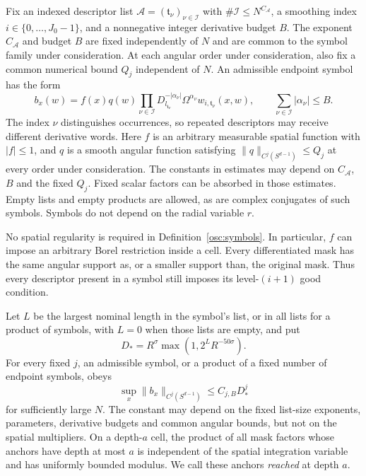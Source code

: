 \begin{definition}\label{osc:symbols}
Fix an indexed descriptor list
$\mathcal A=(\mathfrak t_\nu)_{\nu\in\mathcal I}$ with
$\#\mathcal I\le N^{C_{\mathcal A}}$, a smoothing index
$i\in\{0,\ldots,J_0-1\}$, and a nonnegative integer derivative budget
$B$.  The exponent $C_{\mathcal A}$ and budget $B$ are fixed independently
of $N$ and are common to the symbol family under consideration.  At each
angular order under consideration, also fix a common numerical bound
$Q_j$ independent of $N$.  An admissible endpoint symbol has the form
\begin{equation}\label{osc:symbol-form}
 b_x(w)=f(x)q(w)
       \prod_{\nu\in\mathcal I}
       D_{l_{\mathfrak t_\nu}}^{-|\alpha_\nu|}
       \Omega^{\alpha_\nu}w_{i,\mathfrak t_\nu}(x,w),
 \qquad \sum_{\nu\in\mathcal I}|\alpha_\nu|\le B.
\end{equation}
The index $\nu$ distinguishes occurrences, so repeated descriptors may
receive different derivative words.
Here $f$ is an arbitrary measurable spatial function with $|f|\le1$,
and $q$ is a smooth angular function satisfying
$\|q\|_{C^j(S^{d-1})}\le Q_j$ at every order under consideration.
The constants in estimates may depend on $C_{\mathcal A}$, $B$ and the
fixed $Q_j$.
Fixed scalar factors can be absorbed in those estimates.  Empty lists
and empty products are allowed, as are complex conjugates of such
symbols.  Symbols do not depend on the radial variable $r$.
\end{definition}

No spatial regularity is required in Definition~\ref{osc:symbols}.
In particular, $f$ can impose an arbitrary Borel restriction inside a
cell.  Every differentiated mask has the same angular support as, or a
smaller support than, the original mask.  Thus every descriptor present
in a symbol still imposes its level-$(i+1)$ good condition.

\begin{lemma}
\label{osc:symbol-bounds}
Let $L$ be the largest nominal length in the symbol's list, or in all
lists for a product of symbols, with $L=0$ when those lists are empty, and put
\begin{equation}\label{osc:derivative-scale}
 D_*=R^\sigma\max(1,2^L R^{-50\sigma}).
\end{equation}
For every fixed $j$, an admissible symbol, or a product of a fixed number
of endpoint symbols, obeys
\begin{equation}\label{osc:angular-derivatives}
 \sup_x\|b_x\|_{C^j(S^{d-1})}\le C_{j,B}D_*^j
\end{equation}
for sufficiently large $N$.  The constant may depend on the fixed
list-size exponents, parameters, derivative budgets and common angular
bounds, but not on the spatial multipliers.  On a depth-$a$ cell, the product of all mask factors
whose anchors have depth at most $a$ is independent of the spatial
integration variable and has uniformly bounded modulus.  We call these
anchors \emph{reached} at depth $a$.
\end{lemma}


